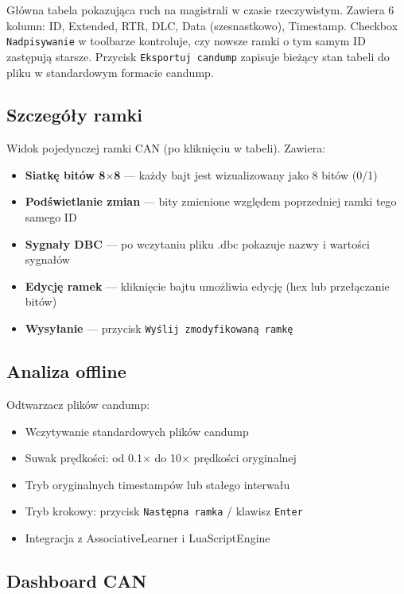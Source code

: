 \documentclass[a4paper,12pt]{article}
\begin{document}
Główna tabela pokazująca ruch na magistrali w czasie rzeczywistym. Zawiera 6 kolumn: ID, Extended, RTR, DLC, Data (szesnastkowo), Timestamp. Checkbox \texttt{Nadpisywanie} w toolbarze kontroluje, czy nowsze ramki o tym samym ID zastępują starsze. Przycisk \texttt{Eksportuj candump} zapisuje bieżący stan tabeli do pliku w standardowym formacie candump.

\subsection{Szczegóły ramki}

Widok pojedynczej ramki CAN (po kliknięciu w tabeli). Zawiera:

\begin{itemize}[nosep]
    \item \textbf{Siatkę bitów 8$\times$8} — każdy bajt jest wizualizowany jako 8 bitów (0/1)
    \item \textbf{Podświetlanie zmian} — bity zmienione względem poprzedniej ramki tego samego ID
    \item \textbf{Sygnały DBC} — po wczytaniu pliku .dbc pokazuje nazwy i wartości sygnałów
    \item \textbf{Edycję ramek} — kliknięcie bajtu umożliwia edycję (hex lub przełączanie bitów)
    \item \textbf{Wysyłanie} — przycisk \texttt{Wyślij zmodyfikowaną ramkę}
\end{itemize}

\subsection{Analiza offline}

Odtwarzacz plików candump:

\begin{itemize}[nosep]
    \item Wczytywanie standardowych plików candump
    \item Suwak prędkości: od 0.1$\times$ do 10$\times$ prędkości oryginalnej
    \item Tryb oryginalnych timestampów lub stałego interwału
    \item Tryb krokowy: przycisk \texttt{Następna ramka} / klawisz \texttt{Enter}
    \item Integracja z AssociativeLearner i LuaScriptEngine
\end{itemize}

\subsection{Dashboard CAN}
\end{document}
